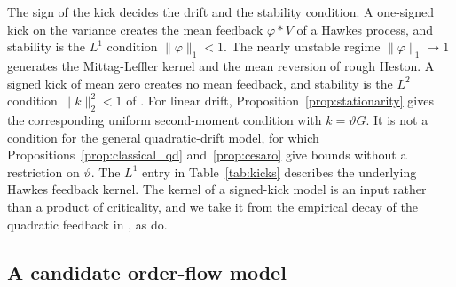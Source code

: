 The sign of the kick decides the drift and the stability condition. A one-signed kick on the variance creates the mean feedback $\varphi*V$ of a Hawkes process, and stability is the $L^1$ condition $\|\varphi\|_1<1$. The nearly unstable regime $\|\varphi\|_1\to1$ generates the Mittag-Leffler kernel and the mean reversion of rough Heston. A signed kick of mean zero creates no mean feedback, and stability is the $L^2$ condition $\|k\|_2^2<1$ of \citet{BlancDonierBouchaud2017}. For linear drift, Proposition~\ref{prop:stationarity} gives the corresponding uniform second-moment condition with $k=\vartheta G$. It is not a condition for the general quadratic-drift model, for which Propositions~\ref{prop:classical_qd} and~\ref{prop:cesaro} give bounds without a restriction on $\vartheta$. The $L^1$ entry in Table~\ref{tab:kicks} describes the underlying Hawkes feedback kernel. The kernel of a signed-kick model is an input rather than a product of criticality, and we take it from the empirical decay of the quadratic feedback in \citet{BlancDonierBouchaud2017}, as \citet{GatheralJusselinRosenbaum2020} do.


\subsection{A candidate order-flow model}\label{sec:micro_model}

